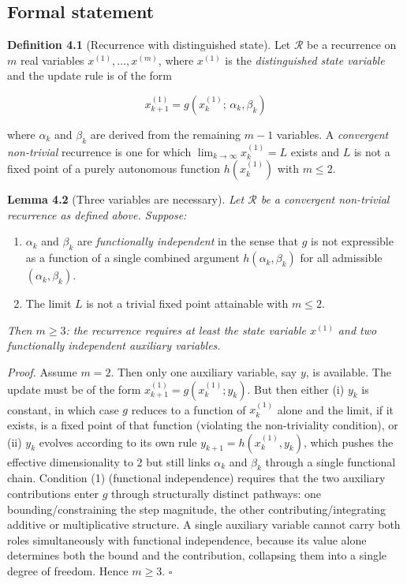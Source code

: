 \documentclass[12pt]{article}
\providecommand{\tightlist}{%
  \setlength{\itemsep}{0pt}\setlength{\parskip}{0pt}}
\begin{document}
\subsection{Formal statement}\label{formal-statement}

\textbf{Definition 4.1} (Recurrence with distinguished state). Let
\(\mathcal{R}\) be a recurrence on \(m\) real variables
\(x^{(1)}, \ldots, x^{(m)}\), where \(x^{(1)}\) is the
\emph{distinguished state variable} and the update rule is of the form

\[x^{(1)}_{k+1} = g\!\left(x^{(1)}_k;\, \alpha_k, \beta_k\right)\]

where \(\alpha_k\) and \(\beta_k\) are derived from the remaining
\(m-1\) variables. A \emph{convergent non-trivial} recurrence is one for
which \(\lim_{k \to \infty} x^{(1)}_k = L\) exists and \(L\) is not a
fixed point of a purely autonomous function \(h(x^{(1)}_k)\) with
\(m \le 2\).

\textbf{Lemma 4.2} (Three variables are necessary). \emph{Let
\(\mathcal{R}\) be a convergent non-trivial recurrence as defined above.
Suppose:}

\begin{enumerate}
\def\labelenumi{\arabic{enumi}.}
\tightlist
\item
  \(\alpha_k\) and \(\beta_k\) are \emph{functionally independent} in
  the sense that \(g\) is not expressible as a function of a single
  combined argument \(h(\alpha_k, \beta_k)\) for all admissible
  \((\alpha_k, \beta_k)\).
\item
  The limit \(L\) is not a trivial fixed point attainable with
  \(m \le 2\).
\end{enumerate}

\emph{Then \(m \ge 3\): the recurrence requires at least the state
variable \(x^{(1)}\) and two functionally independent auxiliary
variables.}

\emph{Proof.} Assume \(m = 2\). Then only one auxiliary variable, say
\(y\), is available. The update must be of the form
\(x^{(1)}_{k+1} = g(x^{(1)}_k; y_k)\). But then either (i) \(y_k\) is
constant, in which case \(g\) reduces to a function of \(x^{(1)}_k\)
alone and the limit, if it exists, is a fixed point of that function
(violating the non-triviality condition), or (ii) \(y_k\) evolves
according to its own rule \(y_{k+1} = h(x^{(1)}_k, y_k)\), which pushes
the effective dimensionality to 2 but still links \(\alpha_k\) and
\(\beta_k\) through a single functional chain. Condition (1) (functional
independence) requires that the two auxiliary contributions enter \(g\)
through structurally distinct pathways: one bounding/constraining the
step magnitude, the other contributing/integrating additive or
multiplicative structure. A single auxiliary variable cannot carry both
roles simultaneously with functional independence, because its value
alone determines both the bound and the contribution, collapsing them
into a single degree of freedom. Hence \(m \ge 3\). \(\square\)
\end{document}
